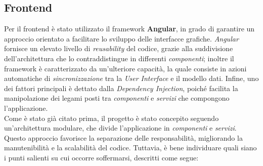 \documentclass{article}
\begin{document}
\subsection*{Frontend}
Per il frontend è stato utilizzato il framework \textbf{Angular}, in grado di garantire un approccio orientato a facilitare lo sviluppo delle interfacce grafiche. \textit{Angular} fornisce un elevato livello di \textit{reusability} del codice, grazie alla suddivisione dell'architettura che lo contraddistingue in differenti \textit{componenti}; inoltre il framework è caratterizzato da un'ulteriore capacità, la quale consiste in azioni automatiche di \textit{sincronizzazione} tra la \textit{User Interface} e il modello dati. Infine, uno dei fattori principali è dettato dalla \textit{Dependency Injection}, poiché facilita la manipolazione dei legami posti tra \textit{componenti} e \textit{servizi} che compongono l'applicazione.\vspace*{7pt}\\
Come è stato già citato prima, il progetto è stato concepito seguendo un'architettura modulare, che divide l'applicazione in \textit{componenti} e \textit{servizi}. Questo approccio favorisce la separazione delle responsabilità, migliorando la manutenibilità e la scalabilità del codice. Tuttavia, è bene individuare quali siano i punti salienti su cui occorre soffermarsi, descritti come segue:
\end{document}

